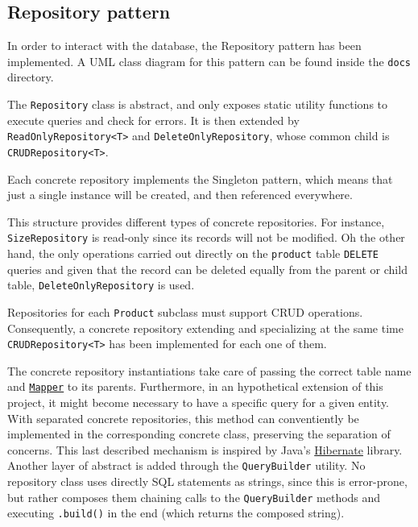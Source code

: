 \documentclass[10pt]{article}
\begin{document}
\subsection{Repository pattern}
\label{sec:repositoryPattern}
In order to interact with the database, the Repository pattern has been
implemented. A UML class diagram for this pattern can be found inside the
\texttt{docs} directory.

The \texttt{Repository} class is abstract, and only exposes static utility
functions to execute queries and check for errors. It is then extended by
\texttt{ReadOnlyRepository<T>} and \texttt{DeleteOnlyRepository}, whose common
child is \texttt{CRUDRepository<T>}.

Each concrete repository implements the Singleton pattern, which means that
just a single instance will be created, and then referenced everywhere.

This structure provides different types of concrete repositories. For instance,
\texttt{SizeRepository} is read-only since its records will not be modified. Oh
the other hand, the only operations carried out directly on the
\texttt{product} table \texttt{DELETE} queries and given that the record can be
deleted equally from the parent or child table, \texttt{DeleteOnlyRepository}
is used.

Repositories for each \texttt{Product} subclass must support CRUD operations.
Consequently, a concrete repository extending and specializing at the same time
\texttt{CRUDRepository<T>} has been implemented for each one of them.

The concrete repository instantiations take care of passing the correct table
name and \hyperref[txt:Mapper]{\texttt{Mapper}} to its parents. Furthermore, in
an hypothetical extension of this project, it might become necessary to have a
specific query for a given entity. With separated concrete repositories, this
method can conventiently be implemented in the corresponding concrete class,
preserving the separation of concerns. This last described mechanism is
inspired by Java's \href{https://hibernate.org/}{Hibernate}
library.\\\linebreak Another layer of abstract is added through the
\texttt{QueryBuilder} utility. No repository class uses directly SQL statements
as strings, since this is error-prone, but rather composes them chaining calls
to the \texttt{QueryBuilder} methods and executing \texttt{.build()} in the end
(which returns the composed string).
\end{document}

